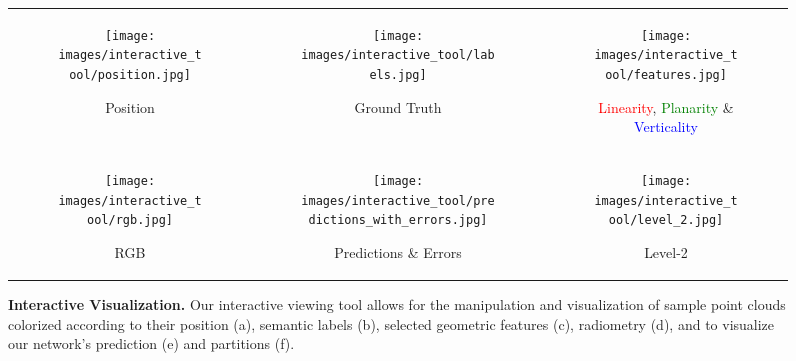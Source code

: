 \renewcommand\thefigure{A-\arabic{figure}}
\renewcommand\thesection{A-\arabic{section}}
\renewcommand\thetable{A-\arabic{table}}
\renewcommand\theequation{A-\arabic{equation}}
\renewcommand\thealgorithm{A-\arabic{algorithm}} 
\setcounter{equation}{0}
\setcounter{section}{0}
\setcounter{figure}{0}
\setcounter{algorithm}{0}
\setcounter{table}{0}

\begin{figure*}[ht!]
\centering
\begin{tabular}{@{}ccc@{}}

\begin{subfigure}[b]{0.3\textwidth}
  \texttt{[image: images/interactive\_tool/position.jpg]}
  \caption{Position}
  \label{fig:tool:rgb}
\end{subfigure}
&
\begin{subfigure}[b]{0.3\textwidth}
  \texttt{[image: images/interactive\_tool/labels.jpg]}
  \caption{Ground Truth}
  \label{fig:tool:gt}
\end{subfigure}
 & 
\begin{subfigure}[b]{0.3\textwidth}
  \texttt{[image: images/interactive\_tool/features.jpg]}
  \caption{\textcolor{red}{Linearity}, \textcolor{green}{Planarity} \& \textcolor{blue}{Verticality}}
  \label{fig:tool:feat}
\end{subfigure}
\\

\begin{subfigure}[b]{0.3\textwidth}
  \texttt{[image: images/interactive\_tool/rgb.jpg]}
  \caption{RGB}
  \label{fig:tool:rgb}
\end{subfigure}
&
\begin{subfigure}[b]{0.3\textwidth}
  \texttt{[image: images/interactive\_tool/predictions\_with\_errors.jpg]}
  \caption{Predictions \& Errors}
  \label{fig:tool:pred}
\end{subfigure}
&
\begin{subfigure}[b]{0.35\textwidth}
  \texttt{[image: images/interactive\_tool/level\_2.jpg]}
  \caption{Level-2}
  \label{fig:tool:level2}
\end{subfigure}
\\

\end{tabular}

\caption{{\bf Interactive Visualization.} Our interactive viewing tool allows for the manipulation and visualization of sample point clouds colorized according to their position (a), semantic labels (b), selected geometric features (c), radiometry (d), and to visualize our network's prediction (e) and partitions (f).}

\label{fig:visu}
\end{figure*} 
